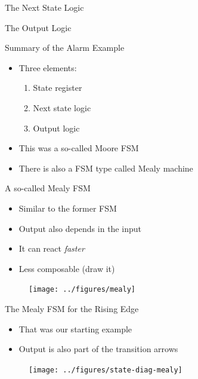 \begin{frame}[fragile]{The Next State Logic}
\end{frame}

\begin{frame}[fragile]{The Output Logic}
\end{frame}

\begin{frame}[fragile]{Summary of the Alarm Example}
\begin{itemize}
\item Three elements:
\begin{enumerate}
\item State register
\item Next state logic
\item Output logic
\end{enumerate}
\item This was a so-called Moore FSM
\item There is also a FSM type called Mealy machine
\end{itemize}
\end{frame}

\begin{frame}[fragile]{A so-called Mealy FSM}
\begin{itemize}
\item Similar to the former FSM
\item Output also depends in the input
\item It can react \emph{faster}
\item Less composable (draw it)
\end{itemize}
\begin{figure}
  \texttt{[image: ../figures/mealy]}
\end{figure}
\end{frame}

\begin{frame}[fragile]{The Mealy FSM for the Rising Edge}
\begin{itemize}
\item That was our starting example
\item Output is also part of the transition arrows
\end{itemize}
\begin{figure}
  \texttt{[image: ../figures/state-diag-mealy]}
\end{figure}
\end{frame}

